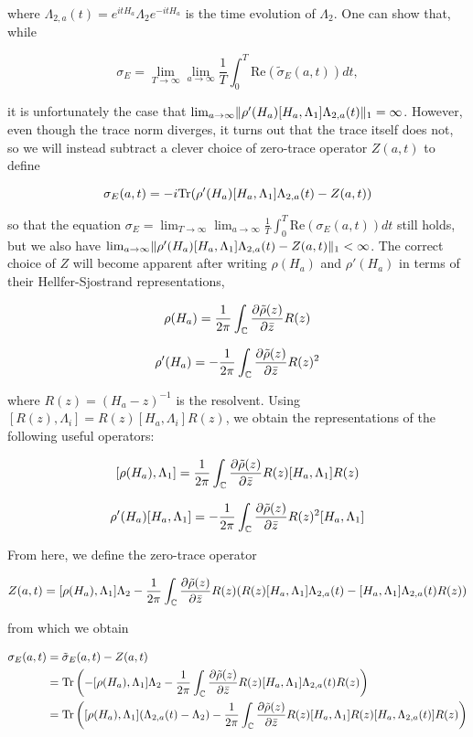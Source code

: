 \documentclass[12pt, letterpaper]{article}
\begin{document}
where $\Lambda_{2,a}(t) = e^{itH_a}\Lambda_2 e^{-itH_a}$ is the time evolution of $\Lambda_2$. One can show that, while 

\[\sigma_E = \lim_{T\to\infty}\lim_{a\to\infty} \frac{1}{T}\int_0^T \text{Re}(\tilde{\sigma}_E(a,t))dt,\]

it is unfortunately the case that $\lim_{a\to\infty}\lVert \rho'(H_a)[H_a,\Lambda_1]\Lambda_{2,a}(t) \rVert_1 = \infty$. However, even though the trace norm diverges, it turns out that the trace itself does not, so we will instead subtract a clever choice of zero-trace operator $Z(a,t)$ to define

\[\sigma_E(a,t) = -i\text{Tr}(\rho'(H_a)[H_a,\Lambda_1]\Lambda_{2,a}(t)-Z(a,t))\]

so that the equation $\sigma_E = \lim_{T\to\infty}\lim_{a\to\infty} \frac{1}{T}\int_0^T \text{Re}(\sigma_E(a,t))dt$ still holds, but we also have $\lim_{a\to\infty}\lVert \rho'(H_a)[H_a,\Lambda_1]\Lambda_{2,a}(t) - Z(a,t) \rVert_1 < \infty$. The correct choice of $Z$ will become apparent after writing $\rho(H_a)$ and $\rho'(H_a)$ in terms of their Hellfer-Sjostrand representations,

\[\rho(H_a) = \frac{1}{2\pi} \int_{\mathbb{C}} \frac{\partial \tilde{\rho}(z)}{\partial \bar{z}} R(z)\]

\[\rho'(H_a) = -\frac{1}{2\pi}\int_{\mathbb{C}} \frac{\partial \tilde{\rho}(z)}{\partial \bar{z}} R(z)^2\]

where $R(z) = (H_a - z)^{-1}$ is the resolvent. Using $[R(z),\Lambda_i] = R(z)[H_a,\Lambda_i]R(z)$, we obtain the representations of the following useful operators:

\[[\rho(H_a),\Lambda_1] = \frac{1}{2\pi} \int_{\mathbb{C}} \frac{\partial \tilde{\rho}(z)}{\partial \bar{z}} R(z)[H_a,\Lambda_1]R(z)\]

\[\rho'(H_a)[H_a,\Lambda_1] = -\frac{1}{2\pi} \int_{\mathbb{C}} \frac{\partial \tilde{\rho}(z)}{\partial \bar{z}} R(z)^2[H_a,\Lambda_1]\]

From here, we define the zero-trace operator

\[Z(a,t) = [\rho(H_a),\Lambda_1]\Lambda_2 - \frac{1}{2\pi} \int_{\mathbb{C}} \frac{\partial \tilde{\rho}(z)}{\partial \bar{z}} R(z)(R(z)[H_a,\Lambda_1]\Lambda_{2,a}(t) - [H_a,\Lambda_1]\Lambda_{2,a}(t)R(z))\]

from which we obtain

\[\begin{aligned}
\sigma_E(a,t) &= \tilde{\sigma}_E(a,t) - Z(a,t)\\
&= \text{Tr}\left(-[\rho(H_a),\Lambda_1]\Lambda_2 - \frac{1}{2\pi}\int_{\mathbb{C}} \frac{\partial \tilde{\rho}(z)}{\partial \bar{z}}R(z)[H_a,\Lambda_1]\Lambda_{2,a}(t)R(z)\right)\\
&= \text{Tr}\left([\rho(H_a),\Lambda_1](\Lambda_{2,a}(t)-\Lambda_2) - \frac{1}{2\pi}\int_{\mathbb{C}}\frac{\partial \tilde{\rho}(z)}{\partial \bar{z}}R(z)[H_a,\Lambda_1]R(z)[H_a,\Lambda_{2,a}(t)]R(z)\right)
\end{aligned}\]
\end{document}
